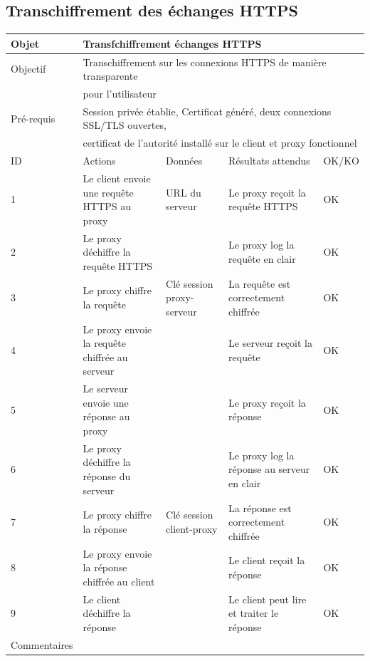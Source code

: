 \documentclass[a4paper,11pt,french]{article}
\begin{document}
\newpage


\subsection{Transchiffrement des échanges HTTPS}

\begin{tabular}{|m{2.5cm}|m{4cm}|m{3cm}|m{3.5cm}|m{2cm}|}
\hline 
\rowcolor{Blue} Objet & \multicolumn{4}{|l|}{Transfchiffrement échanges HTTPS} \\ 
\hline 
\rowcolor{Blue} Objectif & \multicolumn{4}{|l|}{Transchiffrement sur les connexions HTTPS de manière transparente} \\
\rowcolor{Blue} & \multicolumn{4}{|l|}{pour l'utilisateur} \\ 
\hline 
\rowcolor{Blue} Pré-requis & \multicolumn{4}{|l|}{Session privée établie, Certificat généré, deux connexions SSL/TLS ouvertes,} \\ 
\rowcolor{Blue} & \multicolumn{4}{|l|}{certificat de l'autorité installé sur le client et proxy fonctionnel} 
\\
\hline 
\rowcolor{Orange} ID & Actions & Données & Résultats attendus & OK/KO \\ 
\hline 
1 & Le client envoie une requête HTTPS au proxy & URL du serveur & Le proxy reçoit la requête HTTPS &  OK\\ 
\hline
2 & Le proxy déchiffre la requête HTTPS & & Le proxy log la requête en clair & OK\\
\hline
3 & Le proxy chiffre la requête & Clé session proxy-serveur & La requête est 
correctement chiffrée & OK \\
\hline
4 & Le proxy envoie la requête chiffrée au serveur & & Le serveur reçoit la requête & OK\\
\hline
5 & Le serveur envoie une réponse au proxy & & Le proxy reçoit la 
réponse & OK\\
\hline
6 & Le proxy déchiffre la réponse du serveur & & Le proxy log la réponse au 
serveur en clair & OK\\
\hline
7 & Le proxy chiffre la réponse & Clé session client-proxy & La réponse est 
correctement chiffrée & OK\\
\hline
8 & Le proxy envoie la réponse chiffrée au client & & Le client reçoit la réponse 
& OK\\
\hline
9 & Le client déchiffre la réponse & & Le client peut lire et traiter le réponse 
& OK\\
\hline
Commentaires & \multicolumn{4}{|l|}{} \\ 
\hline
\end{tabular}

\newpage
\end{document}
